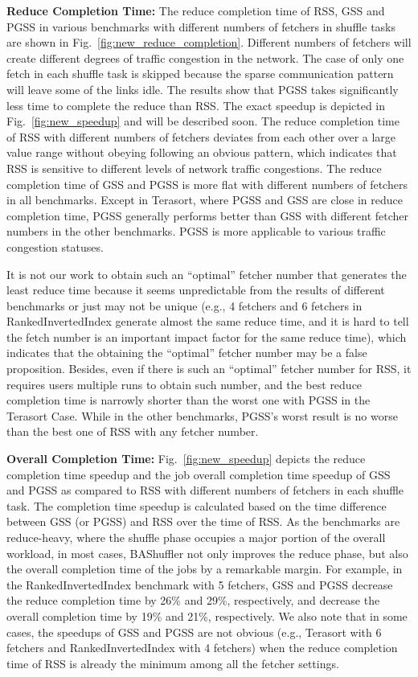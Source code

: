 \documentclass[10pt,journal,compsoc]{IEEEtran}
\begin{document}
\textbf{Reduce Completion Time:} The reduce completion time of RSS, GSS and PGSS in various benchmarks with different numbers of fetchers in shuffle tasks are shown in Fig.~\ref{fig:new_reduce_completion}. 
Different numbers of fetchers will create different degrees of traffic
congestion in the network. 
The case of only one fetch in each shuffle task is skipped because the
sparse communication pattern will leave some of the links idle.
The results show that PGSS takes significantly less
time to complete the reduce than RSS.
The exact speedup is depicted in Fig.~\ref{fig:new_speedup} and will be described soon.
The reduce completion time of RSS with different numbers of fetchers
deviates from each other over a large value range without obeying following an obvious pattern,
which indicates that RSS is sensitive to different levels of network traffic
congestions.
The reduce completion time of GSS and PGSS is more flat
with different numbers of fetchers in all benchmarks.
Except in Terasort, where PGSS and GSS are close in reduce completion time,
PGSS generally performs better than GSS with different fetcher numbers in the other benchmarks. 
PGSS is more applicable to various traffic congestion statuses.

It is not our work to obtain such an ``optimal'' fetcher number that generates the least reduce time because it seems unpredictable from the results of different benchmarks or just may not be unique 
(e.g., 4 fetchers and 6 fetchers in RankedInvertedIndex generate almost the same reduce time, and it is hard to tell the fetch number is an important impact factor for the same reduce time), which indicates that the obtaining the ``optimal'' fetcher number may be a false proposition.
Besides, even if there is such an ``optimal'' fetcher number for RSS, it requires users multiple runs to obtain such number, and the best reduce completion time is narrowly shorter than the worst one with PGSS in the Terasort Case. 
While in the other benchmarks, PGSS's worst result is no worse than the best one of RSS with any fetcher number. 



\textbf{Overall Completion Time:} Fig.~\ref{fig:new_speedup} depicts the reduce completion time speedup
and the job overall completion time speedup of GSS and PGSS as
compared to RSS with different numbers of fetchers in each shuffle
task.
The completion time speedup is calculated based on the time difference between GSS (or PGSS) and RSS over the time of RSS. 
As the benchmarks are reduce-heavy, where the shuffle phase occupies
a major portion of the overall workload, in most cases, BAShuffler not
only improves the reduce phase, but also the overall
completion time of the jobs by a remarkable margin.
For example, in the RankedInvertedIndex benchmark with 5 fetchers, 
GSS and PGSS decrease the reduce completion time by 26\% and 29\%, respectively, 
and decrease the overall completion time by 19\% and 21\%, respectively.  
We also note that in some cases, the speedups of GSS and PGSS are not obvious (e.g.,
Terasort with 6 fetchers and RankedInvertedIndex with 4 fetchers) when
the reduce completion time of RSS is already the minimum among all the
fetcher settings.
\end{document}
